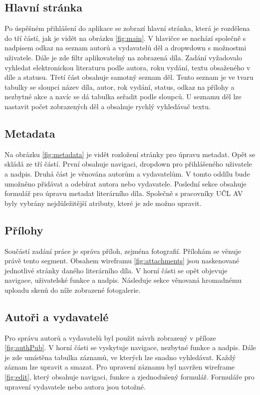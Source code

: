         \subsection{Hlavní stránka}
            Po úspěšném přihlášení do aplikace se zobrazí hlavní stránka, která je rozdělena do tří částí, jak je vidět na obrázku \ref{fig:main}. V hlavičce se nachází společně s nadpisem odkaz na seznam autorů a vydavatelů děl a dropwdown s možnostmi uživatele. Dále je zde filtr aplikovatelný na zobrazená díla. Zadání vyžadovalo vyhledat elektronickou literaturu podle autora, roku vydání, textu obsaženého v díle a statusu. Třetí část obsahuje samotný seznam děl. Tento seznam je ve tvaru tabulky se sloupci název díla, autor, rok vydání, status, odkaz na přílohy a nezbytné akce a navíc se dá tabulka seřadit podle sloupců. U seznamu děl lze nastavit počet zobrazených děl a obsahuje rychlý vyhledávač textu.

        \subsection{Metadata}
            Na obrázku \ref{fig:metadata} je vidět rozložení stránky pro úpravu metadat. Opět se skládá ze tří částí. První obsahuje navigaci, dropdown pro přihlášeného uživatele a nadpis. Druhá část je věnována autorům a vydavatelům. V tomto oddílu bude umožněno přidávat a odebírat autora nebo vydavatele. Poslední sekce obsahuje formulář pro úpravu metadat literárního díla. Společně s pracovníky UČL AV byly vybrány nejdůležitější atributy, které je zde možno upravit. 
        
        \subsection{Přílohy}
            Součástí zadání práce je správa příloh, zejména fotografií. Přílohám se věnuje právě tento segment. Obsahem wireframu \ref{fig:attachments} jsou naskenované jednotlivé stránky daného literárního díla. V horní části se opět objevuje navigace, uživatelské funkce a nadpis. Následuje sekce věnovaná hromadnému uploadu skenů do níže zobrazené fotogalerie.
            
        \subsection{Autoři a vydavatelé}
            Pro správu autorů a vydavatelů byl použit návrh zobrazený v příloze \ref{fig:authPub}. V horní části se vyskytuje navigace, nezbytné funkce a nadpis. Dále je zde umístěna tabulka záznamů, ve kterých lze snadno vyhledávat. Každý záznam lze upravit a smazat. Pro upravení záznamu byl navržen wireframe \ref{fig:edit}, který obsahuje navigaci, funkce a zjednodušený formulář. Formuláře pro upravení vydavatele nebo autora jsou totožné.
            
